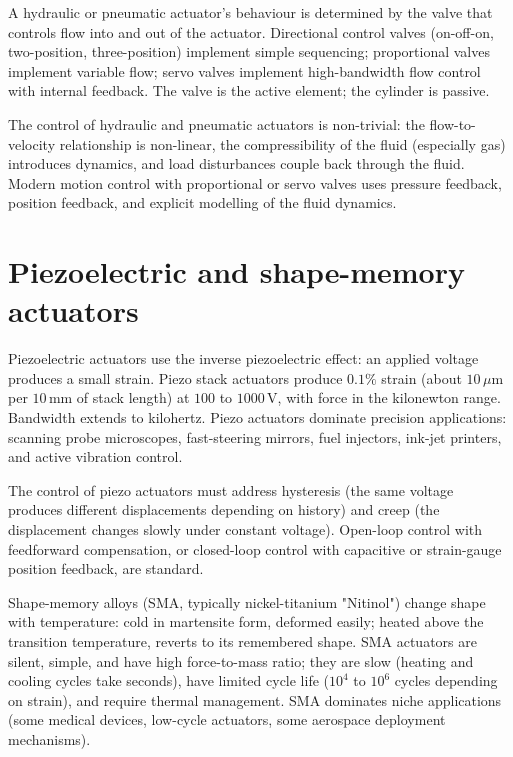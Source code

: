 A hydraulic or pneumatic actuator's behaviour is determined by the valve that controls flow into and out of the actuator. Directional control valves (on-off-on, two-position, three-position) implement simple sequencing; proportional valves implement variable flow; servo valves implement high-bandwidth flow control with internal feedback. The valve is the active element; the cylinder is passive.

The control of hydraulic and pneumatic actuators is non-trivial: the flow-to-velocity relationship is non-linear, the compressibility of the fluid (especially gas) introduces dynamics, and load disturbances couple back through the fluid. Modern motion control with proportional or servo valves uses pressure feedback, position feedback, and explicit modelling of the fluid dynamics.

\section{Piezoelectric and shape-memory actuators}

Piezoelectric actuators use the inverse piezoelectric effect: an applied voltage produces a small strain. Piezo stack actuators produce $0.1\%$ strain (about $10\,\mu\text{m}$ per $10\,\text{mm}$ of stack length) at $100$ to $1000\,\text{V}$, with force in the kilonewton range. Bandwidth extends to kilohertz. Piezo actuators dominate precision applications: scanning probe microscopes, fast-steering mirrors, fuel injectors, ink-jet printers, and active vibration control.

The control of piezo actuators must address hysteresis (the same voltage produces different displacements depending on history) and creep (the displacement changes slowly under constant voltage). Open-loop control with feedforward compensation, or closed-loop control with capacitive or strain-gauge position feedback, are standard.

Shape-memory alloys (SMA, typically nickel-titanium "Nitinol") change shape with temperature: cold in martensite form, deformed easily; heated above the transition temperature, reverts to its remembered shape. SMA actuators are silent, simple, and have high force-to-mass ratio; they are slow (heating and cooling cycles take seconds), have limited cycle life ($10^4$ to $10^6$ cycles depending on strain), and require thermal management. SMA dominates niche applications (some medical devices, low-cycle actuators, some aerospace deployment mechanisms).

